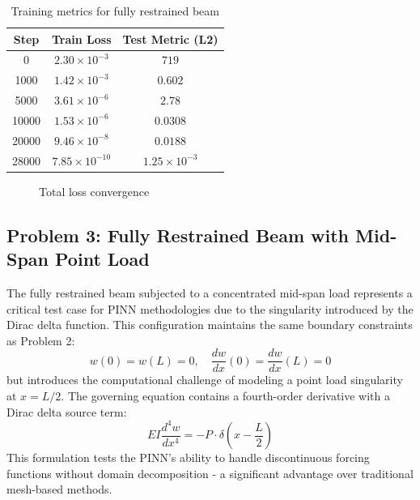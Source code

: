 \documentclass[12pt]{article}
\begin{document}
\begin{table}[htbp]
    \centering
    \begin{tabular}{c c c}
        \toprule
        \textbf{Step} & \textbf{Train Loss} & \textbf{Test Metric (L2)} \\
        \midrule
        0 & $2.30 \times 10^{-3}$ & $719$ \\
        1000 & $1.42 \times 10^{-3}$ & $0.602$ \\
        5000 & $3.61 \times 10^{-6}$ & $2.78$ \\
        10000 & $1.53 \times 10^{-6}$ & $0.0308$ \\
        20000 & $9.46 \times 10^{-8}$ & $0.0188$ \\
        28000 & $7.85 \times 10^{-10}$ & $1.25 \times 10^{-3}$ \\
        \bottomrule
    \end{tabular}
    \caption{Training metrics for fully restrained beam}
    \label{tab:restrained_convergence}
\end{table}

\begin{figure}[htbp]
    \centering
    \caption{Total loss convergence}
    \label{fig:restrained_convergence}
\end{figure}


\subsection{Problem 3: Fully Restrained Beam with Mid-Span Point Load}

The fully restrained beam subjected to a concentrated mid-span load represents a critical test case for PINN methodologies due to the singularity introduced by the Dirac delta function. This configuration maintains the same boundary constraints as Problem 2:
\[
w(0) = w(L) = 0, \quad \frac{dw}{dx}(0) = \frac{dw}{dx}(L) = 0
\]
but introduces the computational challenge of modeling a point load singularity at $x = L/2$. The governing equation contains a fourth-order derivative with a Dirac delta source term:
\[
EI \frac{d^4 w}{dx^4} = -P \cdot \delta\left(x - \frac{L}{2}\right)
\]
This formulation tests the PINN's ability to handle discontinuous forcing functions without domain decomposition - a significant advantage over traditional mesh-based methods.
\end{document}
